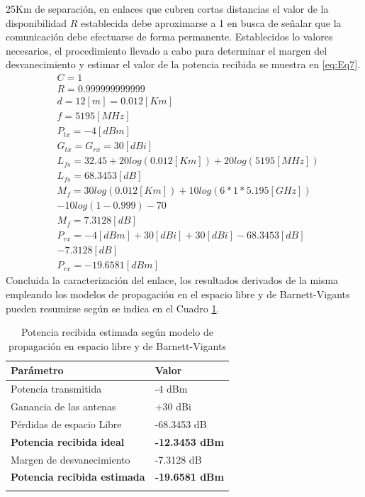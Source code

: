 \documentclass[conference]{IEEEtran}
\begin{document}
25Km de separación, en enlaces que cubren cortas distancias el valor de la disponibilidad $R$ establecida debe aproximarse 
a 1 en busca de señalar que la comunicación debe efectuarse de forma permanente. Establecidos lo valores necesarios, el procedimiento 
llevado a cabo para determinar el margen del desvanecimiento y estimar el valor de la potencia recibida se muestra en \ref{eq:Eq7}.
\begin{equation}
    \label{eq:Eq7}
    \begin{aligned}
        &C = 1\\
        &R = 0.999999999999\\
        &d = 12[m] = 0.012[Km]\\
        &f = 5195[MHz]\\
        &P_{tx} = -4[dBm]\\
        &G_{tx} = G_{rx} = 30[dBi]\\
        &L_{fs} = 32.45+20log(0.012[Km])+20log(5195[MHz])\\
        &L_{fs} = 68.3453[dB]\\
        &M_{f} = 30log(0.012[Km]) + 10log(6*1*5.195[GHz])\\
        & - 10log(1-0.999) - 70\\
        &M_{f} = 7.3128[dB]\\
        &P_{rx} = -4[dBm] + 30[dBi] + 30[dBi] - 68.3453[dB]\\
        & - 7.3128[dB]\\
        &P_{rx} = -19.6581[dBm]
    \end{aligned}
\end{equation}
Concluida la caracterización del enlace, los resultados derivados de la misma empleando los modelos de 
propagación en el espacio libre y de Barnett-Vigants pueden resumirse según se indica en el Cuadro \ref{Cuadro:2}.
\begin{table}[!hbt]
    \begin{center}
        \begin{tabular}{ l  l }
            \hline
            \hline
            \textbf{Parámetro} & \textbf{Valor}\\
            \hline
            Potencia transmitida & -4 dBm \\
            Ganancia de las antenas & +30 dBi\\
            Pérdidas de espacio Libre & -68.3453 dB \\
            \textbf{Potencia recibida ideal} & \textbf{-12.3453 dBm} \\
            Margen de desvanecimiento & -7.3128 dB \\
            \textbf{Potencia recibida estimada}  & \textbf{-19.6581 dBm}\\
            \hline
            \hline\\
        \end{tabular}
    \caption[]{Potencia recibida estimada según modelo de propagación en espacio libre y de Barnett-Vigants}
    \label{Cuadro:2}
    \end{center}
\end{table}
\end{document}
